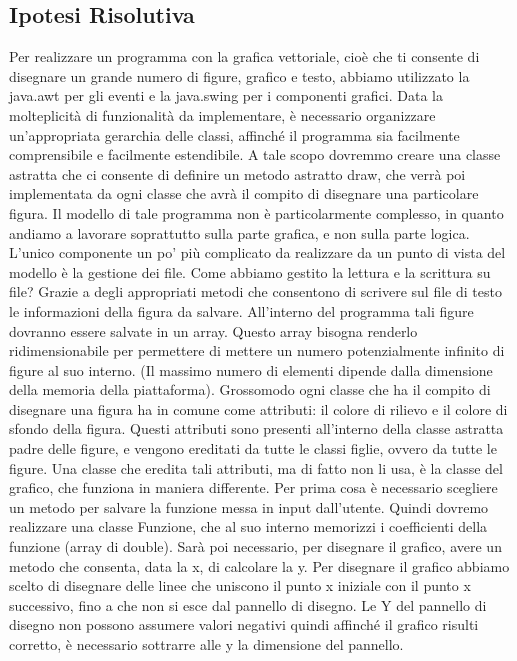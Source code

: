 \documentclass[a4paper,12pt]{article}
\begin{document}
\subsection{Ipotesi Risolutiva}
Per realizzare un programma con la grafica vettoriale, cioè che ti consente di disegnare un grande numero di figure, grafico e testo, abbiamo utilizzato la java.awt per gli eventi e la java.swing per i componenti grafici.
Data la molteplicità di funzionalità da implementare, è necessario organizzare un’appropriata gerarchia delle classi, affinché il programma sia facilmente comprensibile e facilmente estendibile.
A tale scopo dovremmo creare una classe astratta che ci consente di definire un metodo astratto draw, che verrà poi implementata da ogni classe che avrà il compito di disegnare una particolare figura.
Il modello di tale programma non è particolarmente complesso, in quanto andiamo a lavorare soprattutto sulla parte grafica, e non sulla parte logica.
L’unico componente un po’ più complicato da realizzare da un punto di vista del modello è la gestione dei file.
Come abbiamo gestito la lettura e la scrittura su file?
Grazie a degli appropriati metodi che consentono di scrivere sul file di testo le informazioni della figura da salvare.
All’interno del programma tali figure dovranno essere salvate in un array.
Questo array bisogna renderlo ridimensionabile per permettere di mettere un numero potenzialmente infinito di figure al suo interno. (Il massimo numero di elementi dipende dalla dimensione della memoria della piattaforma).
Grossomodo ogni classe che ha il compito di disegnare una figura ha in comune come attributi: il colore di rilievo e il colore di sfondo della figura.
Questi attributi sono presenti all’interno della classe astratta padre delle figure, e vengono ereditati da tutte le classi figlie, ovvero da tutte le figure.
Una classe che eredita tali attributi, ma di fatto non li usa, è la classe del grafico, che funziona in maniera differente.
Per prima cosa è necessario scegliere un metodo per salvare la funzione messa in input dall’utente.
Quindi dovremo realizzare una classe Funzione, che al suo interno memorizzi i coefficienti della funzione (array di double).
Sarà poi necessario, per disegnare il grafico, avere un metodo che consenta, data la x, di calcolare la y.
Per disegnare il grafico abbiamo scelto di disegnare delle linee che uniscono il punto x iniziale con il punto x successivo, fino a che non si esce dal pannello di disegno.
Le Y del pannello di disegno non possono assumere valori negativi quindi affinché il grafico risulti corretto, è necessario sottrarre alle y  la dimensione del pannello.
\end{document}
